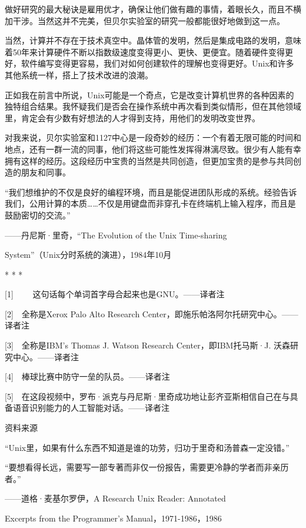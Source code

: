 \documentclass[a4paper,12pt,UTF8,twoside]{ctexbook}
\begin{document}
{{做好研究的最大秘诀是雇用优才，确保让他们做有趣的事情，着眼长久，而且不横加干涉。当然这并不完美，但贝尔实验室的研究一般都能很好地做到这一点。

当然，计算并不存在于技术真空中。晶体管的发明，然后是集成电路的发明，意味着50年来计算硬件不断以指数级速度变得更小、更快、更便宜。随着硬件变得更好，软件编写变得更容易，我们对如何创建软件的理解也变得更好。Unix和许多其他系统一样，搭上了技术改进的浪潮。

正如我在前言中所说，Unix可能是一个奇点，它是改变计算机世界的各种因素的独特组合结果。我怀疑我们是否会在操作系统中再次看到类似情形，但在其他领域里，肯定会有少数有好想法的人才得到支持，用他们的发明改变世界。

对我来说，贝尔实验室和1127中心是一段奇妙的经历：一个有着无限可能的时间和地点，还有一群一流的同事，他们将这些可能性发挥得淋漓尽致。很少有人能有幸拥有这样的经历。这段经历中宝贵的当然是共同创造，但更加宝贵的是参与共同创造的朋友和同事。

“我们想维护的不仅是良好的编程环境，而且是能促进团队形成的系统。经验告诉我们，公用计算的本质……不仅是用键盘而非穿孔卡在终端机上输入程序，而且是鼓励密切的交流。”

——丹尼斯·里奇，“The Evolution of the Unix Time-sharing

System”（Unix分时系统的演进），1984年10月





* * *



[1]　 　这句话每个单词首字母合起来也是GNU。——译者注

[2]　全称是Xerox Palo Alto Research Center，即施乐帕洛阿尔托研究中心。——译者注

[3]　全称是IBM’s Thomas J. Watson Research Center，即IBM托马斯·J. 沃森研究中心。——译者注

[4]　棒球比赛中防守一垒的队员。——译者注

[5]　在这段视频中，罗布·派克与丹尼斯·里奇成功地让彭齐亚斯相信自己在与具备语音识别能力的人工智能对话。——译者注





资料来源


“Unix里，如果有什么东西不知道是谁的功劳，归功于里奇和汤普森一定没错。”

“要想看得长远，需要写一部专著而非仅一份报告，需要更冷静的学者而非亲历者。”

——道格·麦基尔罗伊，A Research Unix Reader: Annotated

Excerpts from the Programmer’s Manual，1971-1986，1986

}}
\end{document}
